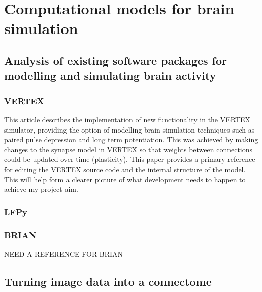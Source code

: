 \section{Computational models for brain simulation}
\subsection[Analysis of existing simulation software packages]{Analysis of existing software packages for modelling and simulating brain activity}
\subsubsection{VERTEX}
This article describes the implementation of new functionality in the VERTEX
simulator, providing the option of modelling brain simulation techniques such as
paired pulse depression and long term potentiation. This was achieved by making
changes to the synapse model in VERTEX so that weights between connections could
be updated over time (plasticity). This paper provides a primary reference for
editing the VERTEX source code and the internal structure of the model. This
will help form a clearer picture of what development needs to happen to achieve
my project aim.

\autocite{tomsett_virtual_2015} \autocite{thornton_virtual_2019}
\subsubsection{LFPy}
\autocite{hagen_lfpy_2019} \autocite{hagen_hybrid_2016}
\subsubsection{BRIAN}
NEED A REFERENCE FOR BRIAN
\subsection{Turning image data into a connectome}